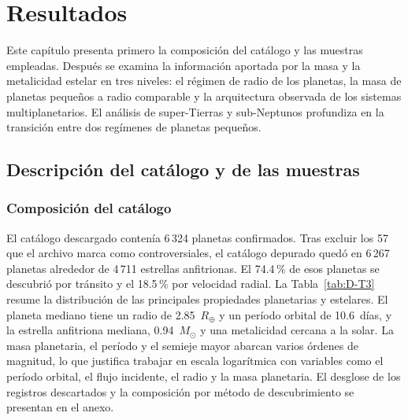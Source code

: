 
\chapter{Resultados}
\label{cap:resultados}

Este capítulo presenta primero la composición del catálogo y las muestras empleadas. Después se examina la información aportada por la masa y la metalicidad estelar en tres niveles: el régimen de radio de los planetas, la masa de planetas pequeños a radio comparable y la arquitectura observada de los sistemas multiplanetarios. El análisis de super-Tierras y sub-Neptunos profundiza en la transición entre dos regímenes de planetas pequeños.

\section{Descripción del catálogo y de las muestras}
\label{sec:res-catalogo}

\subsection{Composición del catálogo}
\label{sec:res-catalogo-composicion}

El catálogo descargado contenía 6\,324 planetas confirmados. Tras excluir los 57 que el archivo marca como controversiales, el catálogo depurado quedó en 6\,267 planetas alrededor de 4\,711 estrellas anfitrionas. El 74.4\,\% de esos planetas se descubrió por tránsito y el 18.5\,\% por velocidad radial. La Tabla~\ref{tab:D-T3} resume la distribución de las principales propiedades planetarias y estelares. El planeta mediano tiene un radio de 2.85~$R_\oplus$ y un período orbital de 10.6~días, y la estrella anfitriona mediana, 0.94~$M_\odot$ y una metalicidad cercana a la solar. La masa planetaria, el período y el semieje mayor abarcan varios órdenes de magnitud, lo que justifica trabajar en escala logarítmica con variables como el período orbital, el flujo incidente, el radio y la masa planetaria. El desglose de los registros descartados y la composición por método de descubrimiento se presentan en el anexo.

